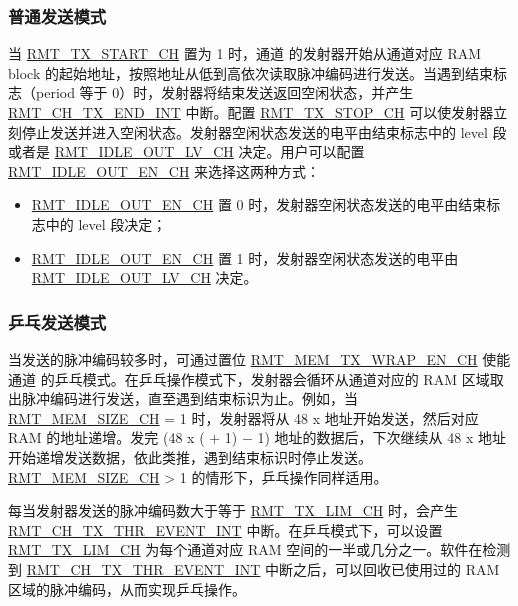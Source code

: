 \documentclass[main\_\_CN.tex]{subfiles}
\begin{document}
\subsubsection{普通发送模式}\label{sec:normal-tx-mode}
当 \hyperref[fielddesc:RMTTXSTARTCHN]{RMT\_TX\_START\_CH} 置为 1 时，通道  的发射器开始从通道对应 RAM block 的起始地址，按照地址从低到高依次读取脉冲编码进行发送。当遇到结束标志（period 等于 0）时，发射器将结束发送返回空闲状态，并产生 \hyperref[int:RMTCHnTXENDINT]{RMT\_CH\_TX\_END\_INT} 中断。配置 \hyperref[fielddesc:RMTTXSTOPCHN]{RMT\_TX\_STOP\_CH} 可以使发射器立刻停止发送并进入空闲状态。发射器空闲状态发送的电平由结束标志中的 level 段或者是 \hyperref[fielddesc:RMTIDLEOUTLVCHN]{RMT\_IDLE\_OUT\_LV\_CH} 决定。用户可以配置 \hyperref[fielddesc:RMTIDLEOUTENCHN]{RMT\_IDLE\_OUT\_EN\_CH} 来选择这两种方式：
\begin{itemize}
    \item \hyperref[fielddesc:RMTIDLEOUTENCHN]{RMT\_IDLE\_OUT\_EN\_CH} 置 0 时，发射器空闲状态发送的电平由结束标志中的 level 段决定；
    \item \hyperref[fielddesc:RMTIDLEOUTENCHN]{RMT\_IDLE\_OUT\_EN\_CH} 置 1 时，发射器空闲状态发送的电平由 \hyperref[fielddesc:RMTIDLEOUTLVCHN]{RMT\_IDLE\_OUT\_LV\_CH} 决定。
\end{itemize}


\subsubsection{乒乓发送模式}\label{sec:wrap-tx-mode}

当发送的脉冲编码较多时，可通过置位 \hyperref[fielddesc:RMTMEMTXWRAPENCHN]{RMT\_MEM\_TX\_WRAP\_EN\_CH} 使能通道  的乒乓模式。在乒乓操作模式下，发射器会循环从通道对应的 RAM 区域取出脉冲编码进行发送，直至遇到结束标识为止。例如，当 \hyperref[fielddesc:RMTMEMSIZECHN]{RMT\_MEM\_SIZE\_CH} = 1 时，发射器将从 48 x  地址开始发送，然后对应 RAM 的地址递增。发完 (48 x ( $+$ 1) $-$ 1) 地址的数据后，下次继续从 48 x  地址开始递增发送数据，依此类推，遇到结束标识时停止发送。\hyperref[fielddesc:RMTMEMSIZECHN]{RMT\_MEM\_SIZE\_CH} > 1 的情形下，乒乓操作同样适用。

每当发射器发送的脉冲编码数大于等于 \hyperref[fielddesc:RMTTXLIMCHN]{RMT\_TX\_LIM\_CH} 时，会产生 \hyperref[int:RMTCHnTXTHREVENTINT]{RMT\_CH\_TX\_THR\_EVENT\_INT} 中断。在乒乓模式下，可以设置 \hyperref[fielddesc:RMTTXLIMCHN]{RMT\_TX\_LIM\_CH} 为每个通道对应 RAM 空间的一半或几分之一。软件在检测到 \hyperref[int:RMTCHnTXTHREVENTINT]{RMT\_CH\_TX\_THR\_EVENT\_INT} 中断之后，可以回收已使用过的 RAM 区域的脉冲编码，从而实现乒乓操作。
\end{document}
